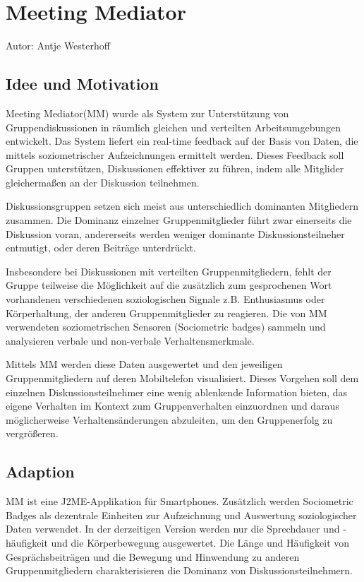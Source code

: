 \section{Meeting Mediator}
Autor: Antje Westerhoff

\subsection{Idee und Motivation}
Meeting Mediator(MM) \cite{KimChaHolPent2008} wurde als System zur Unterstützung
von Gruppendiskussionen in räumlich gleichen und verteilten Arbeitsumgebungen
entwickelt. Das System liefert ein real-time feedback auf der Basis von Daten,
die mittels soziometrischer Aufzeichnungen ermittelt werden. Dieses Feedback
soll Gruppen unterstützen, Diskussionen effektiver zu führen, indem alle
Mitglider gleichermaßen an der Diskussion teilnehmen.

Diskussionsgruppen setzen sich meist aus unterschiedlich dominanten Mitgliedern
zusammen. Die Dominanz einzelner Gruppenmitglieder führt zwar einerseits die
Diskussion voran, andererseits werden weniger dominante Diskussionsteilneher 
entmutigt, oder deren Beiträge unterdrückt.

Insbesondere bei Diskussionen mit verteilten Gruppenmitgliedern, fehlt der
Gruppe teilweise die Möglichkeit auf die zusätzlich zum gesprochenen Wort
vorhandenen verschiedenen soziologischen Signale z.B. Enthusiasmus oder
Körperhaltung, der anderen Gruppenmitglieder zu reagieren.
Die von MM verwendeten soziometrischen Sensoren (Sociometric badges)
\cite{MITbadge} sammeln und analysieren verbale und non-verbale
Verhaltensmerkmale.

Mittels MM werden diese Daten ausgewertet und den jeweiligen Gruppenmitgliedern
auf deren Mobiltelefon visualisiert. Dieses Vorgehen soll dem einzelnen
Diskussionsteilnehmer eine wenig ablenkende Information bieten, das eigene
Verhalten im Kontext zum Gruppenverhalten einzuordnen und daraus möglicherweise
Ver\-hal\-tens\-än\-de\-run\-gen abzuleiten, um den Gruppenerfolg zu
vergrößeren.

\subsection{Adaption}

MM ist eine J2ME-Applikation für Smartphones. Zusätzlich werden Sociometric
Badges als dezentrale Einheiten zur Aufzeichnung und Auswertung
soziologischer Daten verwendet. In der derzeitigen Version werden nur die
Sprechdauer und -häufigkeit und die Körperbewegung ausgewertet.
Die Länge und Häufigkeit von Gesprächsbeiträgen und die Bewegung und Hinwendung
zu anderen Gruppenmitgliedern charakterisieren die Dominanz von
Diskussionsteilnehmern.

